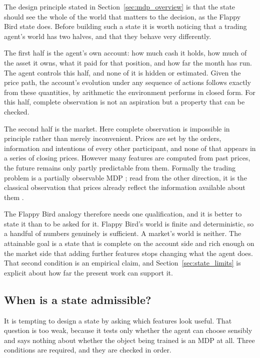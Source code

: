 The design principle stated in Section~\ref{sec:mdp_overview} is that the
state should see the whole of the world that matters to the decision, as
the Flappy Bird state does. Before building such a state it is worth
noticing that a trading agent's world has two halves, and that they
behave very differently.

The first half is the agent's own account: how much cash it holds, how
much of the asset it owns, what it paid for that position, and how far
the month has run. The agent controls this half, and none of it is hidden
or estimated. Given the price path, the account's evolution under any
sequence of actions follows exactly from these quantities, by arithmetic
the environment performs in closed form. For this half, complete
observation is not an aspiration but a property that can be checked.

The second half is the market. Here complete observation is impossible in
principle rather than merely inconvenient. Prices are set by the orders,
information and intentions of every other participant, and none of that
appears in a series of closing prices. However many features are computed
from past prices, the future remains only partly predictable from them.
Formally the trading problem is a partially observable MDP
\cite{kaelbling1998}; read from the other direction, it is the classical
observation that prices already reflect the information available about
them \cite{fama1970}.

The Flappy Bird analogy therefore needs one qualification, and it is
better to state it than to be asked for it. Flappy Bird's world is finite
and deterministic, so a handful of numbers genuinely is sufficient. A
market's world is neither. The attainable goal is a state that is
complete on the account side and rich enough on the market side that
adding further features stops changing what the agent does. That second
condition is an empirical claim, and Section~\ref{sec:state_limits} is
explicit about how far the present work can support it.

\subsection{When is a state admissible?}
\label{sec:state_admissible}

It is tempting to design a state by asking which features look useful.
That question is too weak, because it tests only whether the agent can
choose sensibly and says nothing about whether the object being trained is
an MDP at all. Three conditions are required, and they are checked in
order.

